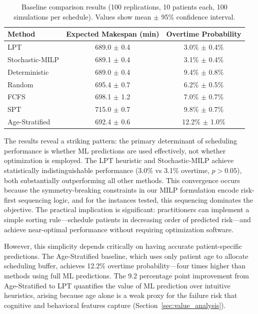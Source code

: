 \documentclass[11pt,a4paper]{article}
\begin{document}
\begin{table}[htbp]
\centering
\caption{Baseline comparison results (100 replications, 10 patients each, 100 simulations per schedule). Values show mean $\pm$ 95\% confidence interval.}
\label{tab:baseline_results}
\begin{tabular}{@{}lcc@{}}
\toprule
\textbf{Method} & \textbf{Expected Makespan (min)} & \textbf{Overtime Probability} \\
\midrule
LPT & 689.0 $\pm$ 0.4 & 3.0\% $\pm$ 0.4\% \\
Stochastic-MILP & 689.1 $\pm$ 0.4 & 3.1\% $\pm$ 0.4\% \\
Deterministic & 689.0 $\pm$ 0.4 & 9.4\% $\pm$ 0.8\% \\
Random & 695.4 $\pm$ 0.7 & 6.2\% $\pm$ 0.5\% \\
FCFS & 698.1 $\pm$ 1.2 & 7.0\% $\pm$ 0.7\% \\
SPT & 715.0 $\pm$ 0.7 & 9.8\% $\pm$ 0.7\% \\
Age-Stratified & 692.4 $\pm$ 0.6 & 12.2\% $\pm$ 1.0\% \\
\bottomrule
\end{tabular}
\end{table}

The results reveal a striking pattern: the primary determinant of scheduling performance is whether ML predictions are used effectively, not whether optimization is employed. The LPT heuristic and Stochastic-MILP achieve statistically indistinguishable performance (3.0\% vs 3.1\% overtime, $p > 0.05$), both substantially outperforming all other methods. This convergence occurs because the symmetry-breaking constraints in our MILP formulation encode risk-first sequencing logic, and for the instances tested, this sequencing dominates the objective. The practical implication is significant: practitioners can implement a simple sorting rule---schedule patients in decreasing order of predicted risk---and achieve near-optimal performance without requiring optimization software.

However, this simplicity depends critically on having accurate patient-specific predictions. The Age-Stratified baseline, which uses only patient age to allocate scheduling buffer, achieves 12.2\% overtime probability---four times higher than methods using full ML predictions. The 9.2 percentage point improvement from Age-Stratified to LPT quantifies the value of ML prediction over intuitive heuristics, arising because age alone is a weak proxy for the failure risk that cognitive and behavioral features capture (Section~\ref{sec:value_analysis}).
\end{document}

